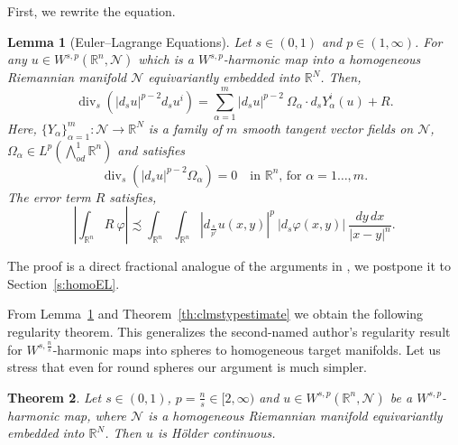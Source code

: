 \documentclass[12pt]{amsart}
\def\n{{\mathcal N}}
\newtheorem{theorem}{Theorem}
\newtheorem{lemma}[theorem]{Lemma}
\theoremstyle{definition}
\newcommand{\R}{\mathbb{R}}
\newcommand{\brac}[1]{\left (#1 \right )}
\newcommand{\Ep}{\bigwedge\nolimits}
\numberwithin{theorem}{section} \numberwithin{equation}{section}
\renewcommand{\div}{\operatorname{div}}
\newcommand{\aleq}{\precsim}
\begin{document}
First, we rewrite the equation.
\begin{lemma}[Euler--Lagrange Equations]\label{la:homoEL}
Let $s \in (0,1)$ and $p \in (1,\infty)$. For any $u \in W^{s,p}(\R^n,\mathcal{N})$ which is a $W^{s,p}$-harmonic map into a homogeneous Riemannian manifold $\mathcal{N}$ equivariantly embedded into $\R^N$. Then, 
\begin{equation}\label{eq:homoel}
 \div_s (|d_s u|^{p-2} d_s u^i)= \sum_{\alpha=1}^m |d_s u|^{p-2}\ \Omega_\alpha \cdot d_s Y_\alpha^i(u) + R.
\end{equation}
Here, $\{Y_\alpha\}_{\alpha=1}^m: \mathcal{N} \to \R^N$ is a family of $m$ smooth tangent vector fields on $\n$, $\Omega_\alpha \in L^p(\Ep^1_{od} \R^n)$ and satisfies
\begin{equation}\label{eq:homodiv0}
 \div_s \brac{|d_s u|^{p-2}\Omega_\alpha} = 0 \quad \mbox{in $\R^n$, for $\alpha =1\ldots,m$}.
\end{equation}
The error term $R$ satisfies,
\[
\left |\int_{\R^n} R\ \varphi \right | \aleq  \int_{\R^n}\int_{\R^n} |d_{\frac{s}{p'}}u(x,y)|^p\ |d_{s}\varphi(x,y)|\ \frac{dy\, dx}{|x-y|^n}.
\]
\end{lemma}
% 
The proof is a direct fractional analogue of the arguments in \cite{Helein91-sym, Strzelecki-1994, Toro-Wang}, we postpone it to Section~\ref{s:homoEL}.

From Lemma~\ref{la:homoEL} and Theorem~\ref{th:clmstypestimate} we obtain the following regularity theorem. This generalizes the second-named author's regularity result for $W^{s,\frac{n}{s}}$-harmonic maps into spheres \cite{Schikorra-CPDE} to homogeneous target manifolds. Let us stress that even for round spheres our argument is much simpler.
\begin{theorem}\label{th:liegroupreg}
Let $s \in (0,1)$, $p = \frac{n}{s} \in [2,\infty)$ and $u \in W^{s,p}(\R^n,\mathcal{N})$ be a $W^{s,p}$-harmonic map, where $\mathcal{N}$ is a homogeneous Riemannian manifold equivariantly embedded into $\R^N$. Then $u$ is H\"older continuous.
\end{theorem}
\end{document}

